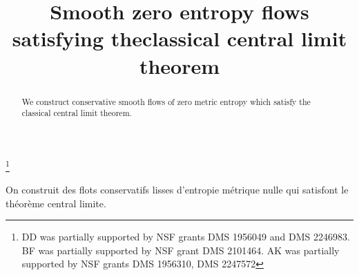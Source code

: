 \documentclass[JEP,XML,SOM,Unicode,NoFloatCountersInSection]{cedram}
\theoremstyle{definition}
\theoremstyle{plain}
\begin{document}
\title[Smooth zero entropy flows satisfying the classical CLT]
{Smooth zero entropy flows satisfying the\nobreakspace classical central limit theorem}

\author[\initial{D.} \lastname{Dolgopyat}]{ }
\address{Department of Mathematics, University of Maryland,\\
College Park MD 20814, USA}

\author[\initial{B.} \lastname{Fayad}]{ }
\address{Department of Mathematics, University of Maryland,\\
College Park MD 20814, USA}

\author[\initial{A.} \lastname{Kanigowski}]{ }
\address{Department of Mathematics, University of Maryland,\\
College Park MD 20814, USA\\
\& Faculty of Mathematics and Computer Science, Jagiellonian University,\\
Łojasiewicza 6, Kraków, Poland}

\thanks{ DD was partially supported by NSF grants DMS 1956049 and DMS 2246983. BF was partially supported by
NSF grant DMS 2101464. AK was partially supported by NSF grants DMS 1956310, DMS 2247572}

\begin{abstract}
We construct conservative smooth flows of zero
metric entropy which satisfy the classical central limit theorem.
\end{abstract}





\begin{altabstract}
On construit des flots conservatifs lisses d'entropie métrique nulle qui satisfont le théorème central limite.
\end{altabstract}

\maketitle
\end{document}
